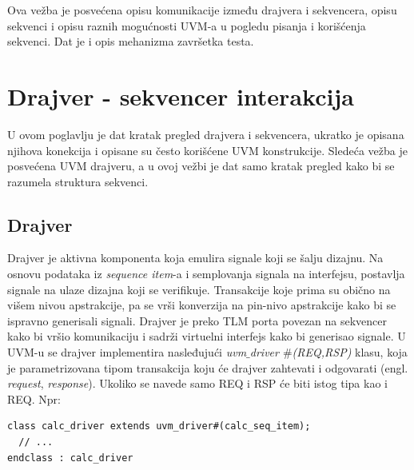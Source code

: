 %
% 

Ova vežba je posvećena opisu komunikacije između drajvera i sekvencera, opisu
sekvenci i opisu raznih mogućnosti UVM-a u pogledu pisanja i korišćenja
sekvenci. Dat je i opis mehanizma završetka testa.


\section{Drajver - sekvencer interakcija}

U ovom poglavlju je dat kratak pregled drajvera i sekvencera, ukratko je opisana
njihova konekcija i opisane su često korišćene UVM konstrukcije. Sledeća vežba
je posvećena UVM drajveru, a u ovoj vežbi je dat samo kratak pregled kako bi se
razumela struktura sekvenci.


\subsection{Drajver}

Drajver je aktivna komponenta koja emulira signale koji se šalju dizajnu. Na
osnovu podataka iz \emph{sequence item}-a i semplovanja signala na interfejsu,
postavlja signale na ulaze dizajna koji se verifikuje. Transakcije koje prima su
obično na višem nivou apstrakcije, pa se vrši konverzija na pin-nivo apstrakcije
kako bi se ispravno generisali signali. Drajver je preko TLM porta povezan na
sekvencer kako bi vršio komunikaciju i sadrži virtuelni interfejs kako bi
generisao signale. U UVM-u se drajver implementira nasleđujući
\emph{uvm\(\_\)driver \(\#\)(REQ,RSP)} klasu, koja je parametrizovana tipom
transakcija koju će drajver zahtevati i odgovarati (engl. \emph{request},
\emph{response}). Ukoliko se navede samo REQ i RSP će biti istog tipa kao i REQ.
Npr:

\begin{lstlisting}
class calc_driver extends uvm_driver#(calc_seq_item);
  // ...
endclass : calc_driver
\end{lstlisting}

